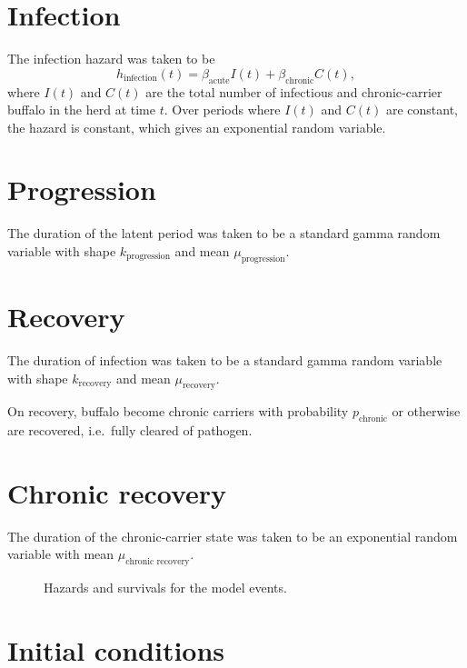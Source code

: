 \documentclass[12pt]{article}
\begin{document}
\section{Infection}

The infection hazard was taken to be
\begin{equation}
  h_{\text{infection}}(t) = \beta_{\text{acute}} I(t) +
  \beta_{\text{chronic}} C(t),
\end{equation}
where $I(t)$ and $C(t)$ are the total number of infectious and
chronic-carrier buffalo in the herd at time $t$.  Over periods where
$I(t)$ and $C(t)$ are constant, the hazard is constant, which gives an
exponential random variable.


\section{Progression}

The duration of the latent period was taken to be a standard gamma
random variable with shape $k_{\text{progression}}$
and mean $\mu_{\text{progression}}$.


\section{Recovery}

The duration of infection was taken to be a standard gamma random
variable with shape $k_{\text{recovery}}$ and mean
$\mu_{\text{recovery}}$.

On recovery, buffalo become chronic carriers with probability
$p_{\text{chronic}}$ or otherwise are recovered, i.e.~fully cleared
of pathogen.


\section{Chronic recovery}

The duration of the chronic-carrier state was taken to be an
exponential random variable with mean
$\mu_{\text{chronic recovery}}$.


\begin{figure}
  \centering
  
  \caption{Hazards and survivals for the model events.}
  \label{fig:distributions}
\end{figure}


\section{Initial conditions}
\end{document}
